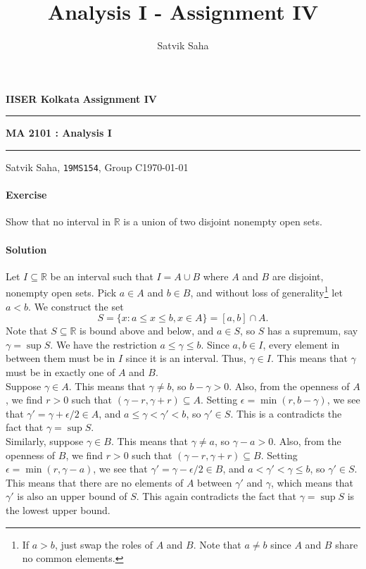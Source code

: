 \documentclass[10pt]{article}
\title{Analysis I - Assignment IV}
\author{Satvik Saha}
\date{}
\newcounter{prob}
\def\problem{\stepcounter{prob}\paragraph{Exercise \arabic{prob}}}
\def\solution{\paragraph{Solution}}
\begin{document}
        \par\textbf{IISER Kolkata} \hfill \textbf{Assignment IV}
        \vspace{3pt}
        \hrule
        \vspace{3pt}
        \begin{center}
                \LARGE{\textbf{MA 2101 : Analysis I}}
        \end{center}
        \vspace{3pt}
        \hrule
        \vspace{3pt}
        Satvik Saha, \texttt{19MS154}, Group C\hfill\today
        \vspace{20pt}

        \problem Show that no interval in $\mathbb{R}$ is a union of two disjoint nonempty open sets.

        \solution Let $I \subseteq \mathbb{R}$ be an interval such that $I = A \cup B$ where $A$ and $B$ are disjoint, nonempty open sets.
        Pick $a \in A$ and $b \in B$, and without loss of generality\footnote{If $a > b$, just swap the roles of $A$ and $B$.
        Note that $a \neq b$ since $A$ and $B$ share no common elements.} let $a < b$.
        We construct the set
        \[
                S = \{x: a \leq x \leq b, x \in A\} = [a, b] \cap A.
        \]
        Note that $S \subseteq \mathbb{R}$ is bound above and below, and $a \in S$, so $S$ has a supremum, say $\gamma = \sup{S}$.
        We have the restriction $a \leq \gamma \leq b$.
        Since $a, b \in I$, every element in between them must be in $I$ since it is an interval. Thus, $\gamma \in I$. This means that
        $\gamma$ must be in exactly one of $A$ and $B$. \\

        Suppose $\gamma \in A$. This means that $\gamma \neq b$, so $b - \gamma > 0$. Also, from the openness of $A$, we find $r > 0$ such that
        $(\gamma - r, \gamma + r) \subseteq A$. Setting $\epsilon = \min(r, b - \gamma)$, we see that $\gamma' = \gamma + \epsilon /2 \in A$,
        and $a \leq \gamma < \gamma' < b$, so $\gamma' \in S$. This is a contradicts the fact that $\gamma = \sup{S}$. \\

        Similarly, suppose $\gamma \in B$. This means that $\gamma \neq a$, so $\gamma - a > 0$. Also, from the openness of $B$, we find $r > 0$ such that
        $(\gamma - r, \gamma + r) \subseteq B$. Setting $\epsilon = \min(r, \gamma - a)$, we see that $\gamma' = \gamma - \epsilon /2 \in B$,
        and $a < \gamma' < \gamma \leq b$, so $\gamma' \in S$. This means that there are no elements of $A$ between $\gamma'$ and $\gamma$,
        which means that $\gamma'$ is also an upper bound of $S$. This again contradicts the fact that $\gamma = \sup{S}$ is the lowest upper bound. \\
\end{document}
